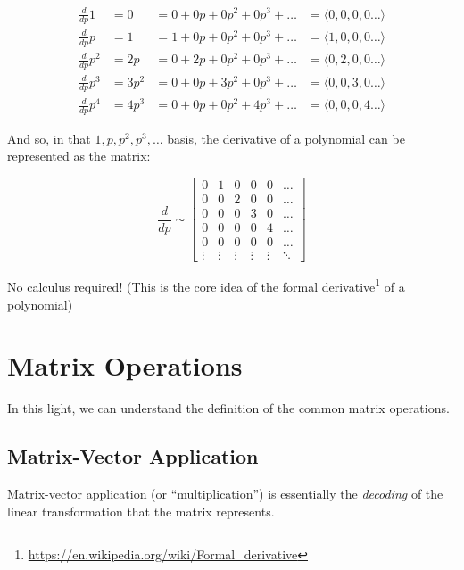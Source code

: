 \documentclass[]{article}
\renewcommand{\href}[2]{#2\footnote{\url{#1}}}
\begin{document}
\[
\begin{aligned}
\frac{d}{dp} 1   & = 0     & = 0 + 0 p + 0 p^2 + 0 p^3 + \ldots
    & = \langle 0, 0, 0, 0 \ldots \rangle  \\
\frac{d}{dp} p   & = 1     & = 1 + 0 p + 0 p^2 + 0 p^3 + \ldots
    & = \langle 1, 0, 0, 0 \ldots \rangle  \\
\frac{d}{dp} p^2 & = 2 p   & = 0 + 2 p + 0 p^2 + 0 p^3 + \ldots
    & = \langle 0, 2, 0, 0 \ldots \rangle  \\
\frac{d}{dp} p^3 & = 3 p^2 & = 0 + 0 p + 3 p^2 + 0 p^3 + \ldots
    & = \langle 0, 0, 3, 0 \ldots \rangle  \\
\frac{d}{dp} p^4 & = 4 p^3 & = 0 + 0 p + 0 p^2 + 4 p^3 + \ldots
    & = \langle 0, 0, 0, 4 \ldots \rangle
\end{aligned}
\]

And so, in that \(1, p, p^2, p^3, \ldots\) basis, the derivative of a polynomial
can be represented as the matrix:

\[
\frac{d}{dp}
\sim
\begin{bmatrix}
0 & 1 & 0 & 0 & 0 & \ldots \\
0 & 0 & 2 & 0 & 0 & \ldots \\
0 & 0 & 0 & 3 & 0 & \ldots \\
0 & 0 & 0 & 0 & 4 & \ldots \\
0 & 0 & 0 & 0 & 0 & \ldots \\
\vdots & \vdots & \vdots & \vdots & \vdots & \ddots
\end{bmatrix}
\]

No calculus required! (This is the core idea of the
\href{https://en.wikipedia.org/wiki/Formal_derivative}{formal derivative} of a
polynomial)

\hypertarget{matrix-operations}{%
\section{Matrix Operations}\label{matrix-operations}}

In this light, we can understand the definition of the common matrix operations.

\hypertarget{matrix-vector-application}{%
\subsection{Matrix-Vector Application}\label{matrix-vector-application}}

Matrix-vector application (or ``multiplication'') is essentially the
\emph{decoding} of the linear transformation that the matrix represents.
\end{document}
